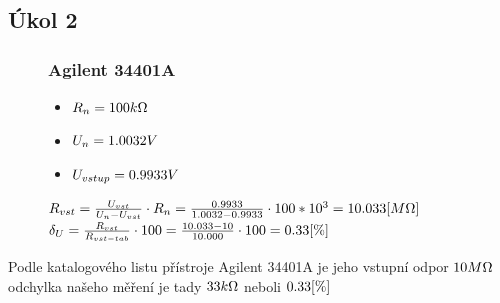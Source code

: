 \documentclass{article}
\begin{document}
\subsection*{Úkol 2}

\begin{figure}[H]
    \begin{minipage}[t]{0.3\textwidth}
        \subsubsection*{Agilent 34401A}
        \begin{itemize}
            \item \(R_n = 100\-k\Omega\) 
            \item \(U_n = 1.0032\-V\) 
            \item \(U_{vstup} = 0.9933\-V\) 
        \end{itemize}
    \end{minipage}
    \hfill
    \begin{minipage}[t]{0.7\textwidth}
        \vspace{10mm}
        \(
            R_{vst} = \frac{U_{vst}}{U_{n}-U_{vst}}\cdot R_n = \frac{0.9933}{1.0032-0.9933}\cdot 100*10^3 = 10.033\-[M\Omega]  
        \)
        \\
        \(
            \delta_U = \frac{R_{vst}}{R_{vst-tab}}\cdot100 = \frac{10.033 - 10}{10.000}\cdot100 = 0.33\-[\%]
        \)
    \end{minipage}
\end{figure}
Podle katalogového listu přístroje Agilent 34401A je jeho vstupní odpor \(10\-M\Omega \)\\odchylka našeho měření je tady \(33\-k\Omega\) neboli \(0.33\-[\%]\)
\end{document}

